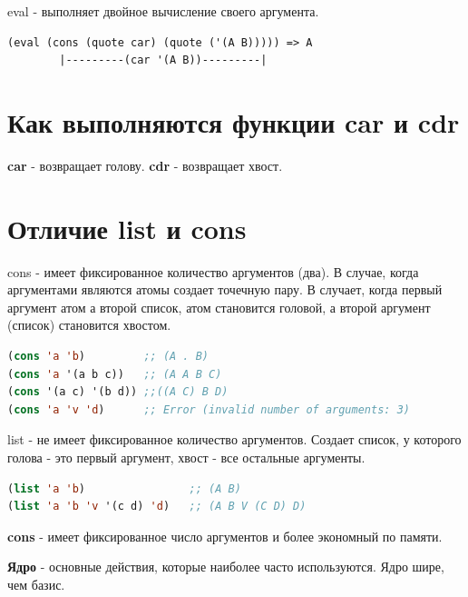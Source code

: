 eval - выполняет двойное вычисление своего аргумента.

\begin{lstlisting}
(eval (cons (quote car) (quote ('(A B))))) => A
		|---------(car '(A B))---------|

\end{lstlisting}


\section{Как выполняются функции car и cdr}

\textbf{car} - возвращает голову.
\textbf{cdr} - возвращает хвост.

\section{Отличие list и cons}

cons - имеет фиксированное количество аргументов (два). 
В случае, когда аргументами являются атомы создает точечную пару.
В случает, когда первый аргумент атом а второй список, атом становится головой,
а второй аргумент (список) становится хвостом. 
\begin{lstlisting}[language=Lisp]
(cons 'a 'b) 		 ;; (A . B)
(cons 'a '(a b c)) 	 ;; (A A B C)
(cons '(a c) '(b d)) ;;((A C) B D)
(cons 'a 'v 'd)  	 ;; Error (invalid number of arguments: 3)
\end{lstlisting}

\begin{figure}[ht!]
\end{figure}

list - не имеет фиксированное количество аргументов. 
Создает список, у которого голова - это первый аргумент,
хвост - все остальные аргументы.
\begin{lstlisting}[language=Lisp]
(list 'a 'b) 				;; (A B)
(list 'a 'b 'v '(c d) 'd) 	;; (A B V (C D) D)
\end{lstlisting}

\begin{figure}[ht!]
\end{figure}

\textbf{cons} - имеет фиксированное число аргументов и более экономный по памяти.

\textbf{Ядро} - основные действия, которые наиболее часто используются. Ядро шире, чем базис.